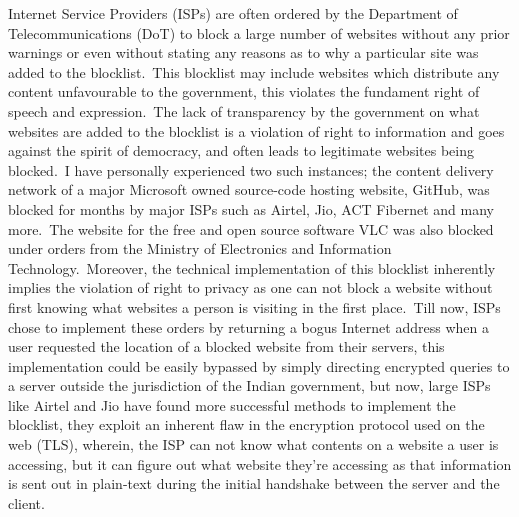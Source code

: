 \documentclass[11pt,a4paper,oneside]{scrarticle}
\begin{document}
    Internet Service Providers (ISPs) are often ordered by the Department of Telecommunications (DoT) to block a large
    number of websites without any prior warnings or even without stating any reasons as to why a particular site was
    added to the blocklist.\ This blocklist may include websites which distribute any content unfavourable to the
    government, this violates the fundament right of speech and expression.\ The lack of transparency by the government
    on what websites are added to the blocklist is a violation of right to information and goes against the spirit of
    democracy, and often leads to legitimate websites being blocked.\ I have personally experienced two such instances;
    the content delivery network of a major Microsoft owned source-code hosting website, GitHub, was blocked for months
    by major ISPs such as Airtel, Jio, ACT Fibernet and many more.\ The website for the free and open source software
    VLC was also blocked under orders from the Ministry of Electronics and Information Technology.\ Moreover, the
    technical implementation of this blocklist inherently implies the violation of right to privacy as one can not block
    a website without first knowing what websites a person is visiting in the first place.\ Till now, ISPs chose to
    implement these orders by returning a bogus Internet address when a user requested the location of a blocked
    website from their servers, this implementation could be easily bypassed by simply directing encrypted queries to a
    server outside the jurisdiction of the Indian government, but now, large ISPs like Airtel and Jio have found more
    successful methods to implement the blocklist, they exploit an inherent flaw in the encryption protocol used on the
    web (TLS), wherein, the ISP can not know what contents on a website a user is accessing, but it can figure out what
    website they're accessing as that information is sent out in plain-text during the initial handshake between the
    server and the client.


\end{document}
